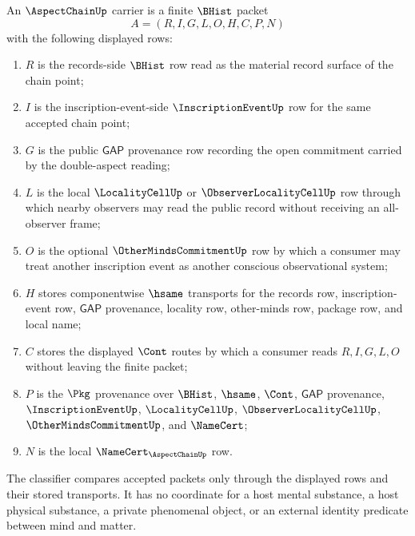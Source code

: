 \begin{definition}
\label{def:aspect-chain-carrier}
An $\AspectChainUp$ carrier is a finite $\BHist$ packet
$$
A=(R,I,G,L,O,H,C,P,N)
$$
with the following displayed rows:
\begin{enumerate}
\item $R$ is the records-side $\BHist$ row read as the material record surface of the chain point;
\item $I$ is the inscription-event-side $\InscriptionEventUp$ row for the same accepted chain point;
\item $G$ is the public $\mathsf{GAP}$ provenance row recording the open commitment carried by the double-aspect reading;
\item $L$ is the local $\LocalityCellUp$ or $\ObserverLocalityCellUp$ row through which nearby observers may read the public record without receiving an all-observer frame;
\item $O$ is the optional $\OtherMindsCommitmentUp$ row by which a consumer may treat another inscription event as another conscious observational system;
\item $H$ stores componentwise $\hsame$ transports for the records row, inscription-event row, $\mathsf{GAP}$ provenance, locality row, other-minds row, package row, and local name;
\item $C$ stores the displayed $\Cont$ routes by which a consumer reads $R,I,G,L,O$ without leaving the finite packet;
\item $P$ is the $\Pkg$ provenance over $\BHist$, $\hsame$, $\Cont$, $\mathsf{GAP}$ provenance, $\InscriptionEventUp$, $\LocalityCellUp$, $\ObserverLocalityCellUp$, $\OtherMindsCommitmentUp$, and $\NameCert$;
\item $N$ is the local $\NameCert_{\AspectChainUp}$ row.
\end{enumerate}
The classifier compares accepted packets only through the displayed rows and their stored transports. It has no coordinate for a host mental substance, a host physical substance, a private phenomenal object, or an external identity predicate between mind and matter.
\end{definition}

